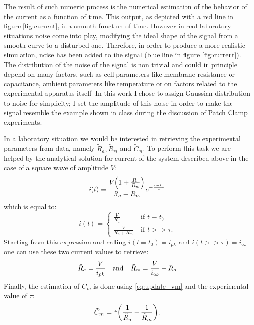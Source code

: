 \documentclass[a4paper]{article}
\begin{document}
The result of such numeric process is the numerical estimation of the behavior of the current as a function of time.
This output, as depicted with a red line in figure \ref{fig:current}, is a smooth function of time.
However in real laboratory situations noise come into play, modifying the ideal shape of the signal from a smooth curve to a disturbed one.
Therefore, in order to produce a more realistic simulation, noise has been added to the signal (blue line in figure \ref{fig:current}).
The distribution of the noise of the signal is non trivial and could in principle depend on many factors, such as cell parameters like membrane resistance or capacitance, ambient parameters like temperature or on factors related to the experimental apparatus itself.
In this work I chose to assign Gaussian distribution to noise for simplicity; I set the amplitude of this noise in order to make the signal resemble the example shown in class during the discussion of Patch Clamp experiments.

In a laboratory situation we would be interested in retrieving the experimental parameters from data, namely $\tilde{R}_a, \tilde{R}_m$ and $\tilde{C}_m.$
To perform this task we are helped by the analytical solution for current of the system described above in the case of a square wave of amplitude $V$:
\begin{equation}
     i(t)=\frac{V\pqty{1+\frac{R_a}{R_m}}}{R_a+R_m} e^{-\frac{t-t_0}{\tau}}
 \end{equation} 
which is equal to:
\begin{equation}
i(t)=
    \begin{cases}
        \frac{V}{R_a} &\text{ if }t=t_0\\
        \frac{V}{R_a + R_m} &\text{ if } t>>\tau.
        
    \end{cases}
\end{equation}
Starting from this expression and calling $i(t=t_0)=i_{pk}$ and $i(t>>\tau) = i_\infty$ one can use these two current values to retrieve:
\begin{equation}
    \tilde{R}_a= \frac{V}{i_{pk}}\qq{and}\tilde{R}_m = \frac{V}{i_\infty} - R_a
    \label{eq:Ra_estimation}
\end{equation}
Finally, the estimation of $C_m$ is done using \eqref{eq:update_vm} and the experimental value of $\tau:$
\begin{equation}
    \tilde{C}_m = \tilde{\tau}\pqty{\frac{1}{\tilde{R}_a}+\frac{1}{\tilde{R}_m}}.
    \label{eq:Cm_est}
\end{equation}
\end{document}

